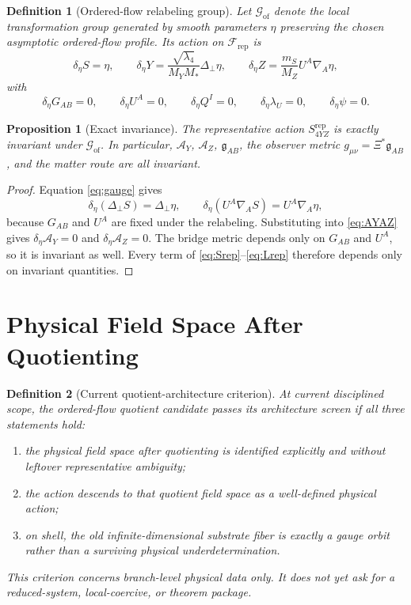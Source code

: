 \documentclass[11pt]{article}
\newcommand{\BridgeMetric}{\mathfrak{g}}
\newcommand{\AY}{\mathcal A_Y}
\newcommand{\AZ}{\mathcal A_Z}
\newcommand{\FieldSpace}{\mathscr F}
\newcommand{\RepFieldSpace}{\FieldSpace_{\mathrm{rep}}}
\newcommand{\GaugeGroup}{\mathscr G_{\mathrm{of}}}
\newtheorem{definition}{Definition}
\newtheorem{proposition}{Proposition}
\begin{document}
\begin{definition}[Ordered-flow relabeling group]
\label{def:gauge}
Let \(\GaugeGroup\) denote the local transformation group generated by smooth parameters \(\eta\) preserving the chosen asymptotic ordered-flow profile. Its action on \(\RepFieldSpace\) is
\begin{equation}
\delta_\eta S=\eta,
\qquad
\delta_\eta Y=\frac{\sqrt{\lambda_4}}{M_YM_*}\Delta_\perp\eta,
\qquad
\delta_\eta Z=\frac{m_S}{M_Z}U^A\nabla_A\eta,
\label{eq:gauge}
\end{equation}
with
\begin{equation}
\delta_\eta G_{AB}=0,
\qquad
\delta_\eta U^A=0,
\qquad
\delta_\eta Q^I=0,
\qquad
\delta_\eta \lambda_U=0,
\qquad
\delta_\eta\psi=0.
\label{eq:gaugefixed}
\end{equation}
\end{definition}

\begin{proposition}[Exact invariance]
\label{prop:invariant}
The representative action \(S_{4YZ}^{\mathrm{rep}}\) is exactly invariant under \(\GaugeGroup\). In particular, \(\AY\), \(\AZ\), \(\BridgeMetric_{AB}\), the observer metric \(g_{\mu\nu}=\Xi^*\BridgeMetric_{AB}\), and the matter route are all invariant.
\end{proposition}

\begin{proof}
Equation \eqref{eq:gauge} gives
\[
\delta_\eta(\Delta_\perp S)=\Delta_\perp\eta,
\qquad
\delta_\eta(U^A\nabla_A S)=U^A\nabla_A\eta,
\]
because \(G_{AB}\) and \(U^A\) are fixed under the relabeling. Substituting into \eqref{eq:AYAZ} gives \(\delta_\eta\AY=0\) and \(\delta_\eta\AZ=0\). The bridge metric depends only on \(G_{AB}\) and \(U^A\), so it is invariant as well. Every term of \eqref{eq:Srep}--\eqref{eq:Lrep} therefore depends only on invariant quantities.
\end{proof}

\section{Physical Field Space After Quotienting}

\begin{definition}[Current quotient-architecture criterion]
\label{def:criterion}
At current disciplined scope, the ordered-flow quotient candidate passes its architecture screen if all three statements hold:
\begin{enumerate}
    \item the physical field space after quotienting is identified explicitly and without leftover representative ambiguity;
    \item the action descends to that quotient field space as a well-defined physical action;
    \item on shell, the old infinite-dimensional substrate fiber is exactly a gauge orbit rather than a surviving physical underdetermination.
\end{enumerate}
This criterion concerns branch-level physical data only. It does not yet ask for a reduced-system, local-coercive, or theorem package.
\end{definition}
\end{document}
